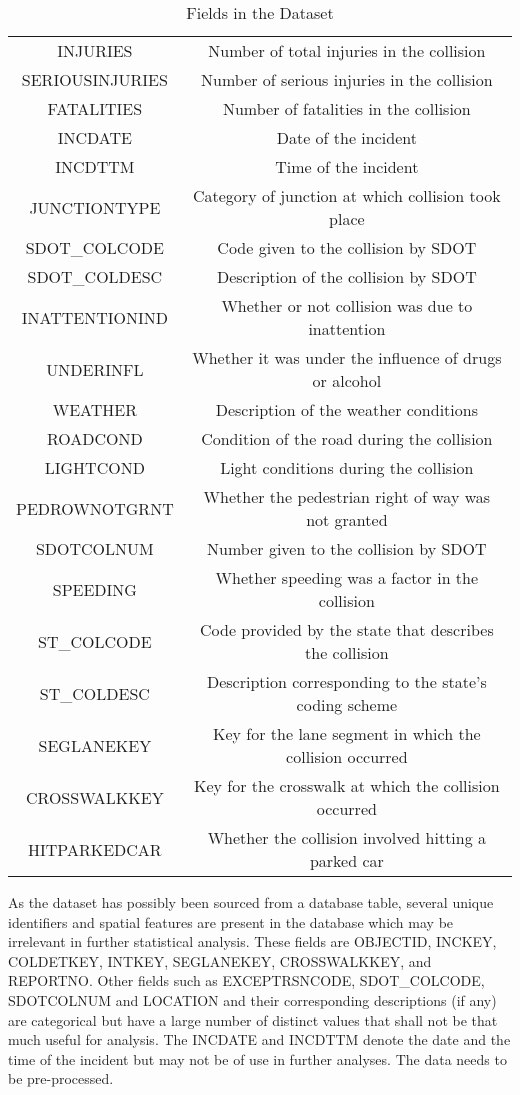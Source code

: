 \documentclass{article}
\begin{document}
\begin{table}
\begin{tabular}{|c | c|}
  INJURIES & Number of total injuries in the collision\\
  SERIOUSINJURIES & Number of serious injuries in the collision\\
  FATALITIES & Number of fatalities in the collision\\
  INCDATE & Date of the incident\\
  INCDTTM & Time of the incident\\
  JUNCTIONTYPE & Category of junction at which collision took place\\
  SDOT\_COLCODE & Code given to the collision by SDOT\\
  SDOT\_COLDESC & Description of the collision by SDOT\\
  INATTENTIONIND & Whether or not collision was due to inattention\\
  UNDERINFL & Whether it was under the influence of drugs or alcohol\\
  WEATHER & Description of the weather conditions\\
  ROADCOND & Condition of the road during the collision\\
  LIGHTCOND & Light conditions during the collision\\
  PEDROWNOTGRNT & Whether the pedestrian right of way was not granted\\
  SDOTCOLNUM & Number given to the collision by SDOT\\
  SPEEDING & Whether speeding was a factor in the collision\\
  ST\_COLCODE & Code provided by the state that describes the collision\\
  ST\_COLDESC & Description corresponding to the state’s coding scheme\\
  SEGLANEKEY & Key for the lane segment in which the collision occurred\\
  CROSSWALKKEY & Key for the crosswalk at which the collision occurred\\
  HITPARKEDCAR & Whether the collision involved hitting a parked car\\
  \hline
  \end{tabular}
  \caption{Fields in the Dataset}\label{fields}
\end{table}

As the dataset has possibly been sourced from a database table, several unique identifiers and spatial features are present in the database which may be irrelevant in further statistical analysis. These fields are OBJECTID, INCKEY, COLDETKEY, INTKEY, SEGLANEKEY, CROSSWALKKEY, and REPORTNO. Other fields such as EXCEPTRSNCODE, SDOT\_COLCODE, SDOTCOLNUM and LOCATION and their corresponding descriptions (if any) are categorical but have a large number of distinct values that shall not be that much useful for analysis. The INCDATE and INCDTTM denote the date and the time of the incident but may not be of use in further analyses. The data needs to be pre-processed.
\end{document}
